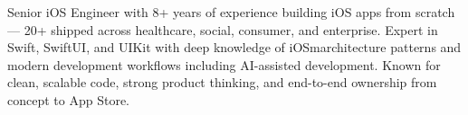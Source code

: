 Senior iOS Engineer with 8+ years of experience building iOS apps from scratch — 20+ shipped across healthcare, social, consumer, and enterprise. Expert in Swift,  SwiftUI, and UIKit with deep knowledge of iOSmarchitecture patterns and modern  development workflows including AI-assisted development. Known for clean, scalable code, strong product thinking, and end-to-end ownership from concept to App Store.